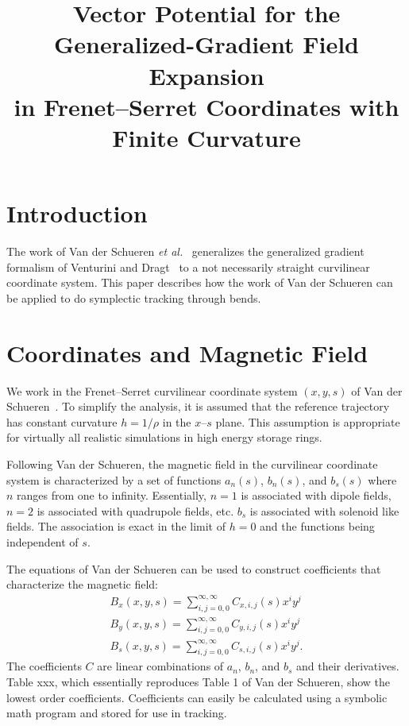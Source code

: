\documentclass[11pt]{article}
\title{Vector Potential for the Generalized-Gradient Field Expansion\\
       in Frenet--Serret Coordinates with Finite Curvature}
\author{}
\date{}
\begin{document}
\maketitle

\section{Introduction}

The work of Van der Schueren \textit{et al.}~\cite{tups09} generalizes the generalized
gradient formalism of Venturini and Dragt~\cite{venturini1999} to a not necessarily straight
curvilinear coordinate system. This paper describes how the work of Van der Schueren
can be applied to do symplectic tracking through bends.

\section{Coordinates and Magnetic Field}

We work in the Frenet--Serret curvilinear coordinate system $(x,y,s)$ of
Van der Schueren~\cite{tups09}. To simplify the analysis, it is assumed that the reference
trajectory has constant curvature $h=1/\rho$ in the $x$--$s$ plane. This assumption is
appropriate for virtually all realistic simulations in high energy storage rings.

Following Van der Schueren, the magnetic field in the curvilinear coordinate
system is characterized by a set of functions $a_n(s)$, $b_n(s)$, and $b_s(s)$ where $n$ ranges
from one to infinity. Essentially, $n = 1$ is associated with dipole fields, $n = 2$ is associated
with quadrupole fields, etc. $b_s$ is associated with solenoid like fields. The association is
exact in the limit of $h = 0$ and the functions being independent of $s$.

The equations of Van der Schueren can be used to construct coefficients that characterize the
magnetic field:
\begin{align}
  B_x(x,y,s) = \sum_{i,j = 0,0}^{\infty,\infty} C_{x,i,j}(s) x^i y^j \label{bxc} \\
  B_y(x,y,s) = \sum_{i,j = 0,0}^{\infty,\infty} C_{y,i,j}(s) x^i y^j \label{byc} \\
  B_s(x,y,s) = \sum_{i,j = 0,0}^{\infty,\infty} C_{s,i,j}(s) x^i y^j . \label{bsc}
\end{align}
The coefficients $C$ are linear combinations of $a_n$, $b_n$, and $b_s$ and their derivatives.
Table xxx, which essentially reproduces Table 1 of Van der Schueren, show the lowest order coefficients.
Coefficients can easily be calculated using a symbolic math program and stored for use in tracking.
\end{document}
